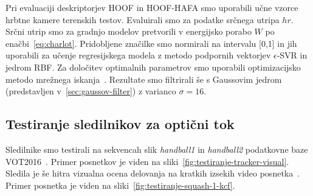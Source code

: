 Pri evaluaciji deskriptorjev HOOF in HOOF-HAFA smo uporabili učne vzorce hrbtne kamere terenskih testov. Evaluirali smo za podatke srčnega utripa $hr$. Srčni utrip smo za gradnjo modelov pretvorili v energijsko porabo $W$ po enačbi~\eqref{eq:charlot}. Pridobljene značilke smo normirali na intervalu [0,1] in jih uporabili za učenje regresijskega modela z metodo podpornih vektorjev $\epsilon$-SVR in jedrom RBF. Za določitev optimalnih parametrov %
smo uporabili optimizacijsko metodo mrežnega iskanja~\cite{hsu2003practical}. Rezultate smo filtrirali še s Gaussovim jedrom (predstavljen v~\ref{sec:gaussov-filter}) z varianco $\sigma=16$. 

\subsection{Testiranje sledilnikov za optični tok}\label{sec:testiranje-sledilnikov-za-opticni-tok}
Sledilnike smo testirali na sekvencah slik \textit{handball1} in \textit{handball2} podatkovne baze VOT2016~\cite{kristan2016visual}. Primer posnetkov je viden na sliki~\ref{fig:testiranje-tracker-visual}. Sledila je še hitra vizualna ocena delovanja na kratkih izsekih video posnetka~\cite{squashtv2014squash}. Primer posnetka je viden na sliki~\ref{fig:testiranje-squash-1-kcf}.

